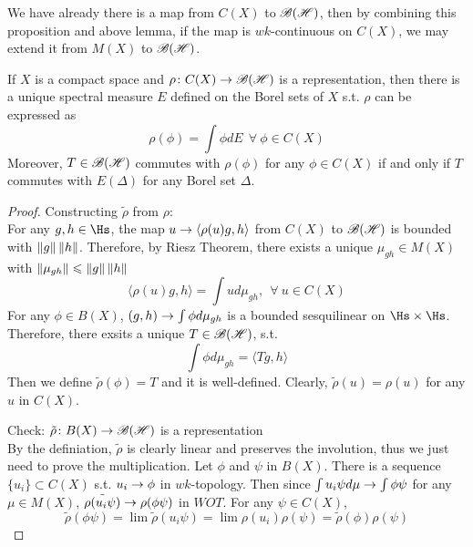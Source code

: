 We have already there is a map from $C(X)$ to $\mathscr{B(H)}$, then by combining this proposition and above lemma, if the map is $wk$-continuous on $C(X)$, we may extend it from $M(X)$ to $\mathscr{B(H)}$.

\begin{thm}
	If $X$ is a compact space and $\rho \colon C(X) \rightarrow \mathscr{B(H)}$ is a representation, then there is a unique spectral measure $E$ defined on the Borel sets of $X$ s.t. $\rho$ can be expressed as 
	\begin{equation*}
		\rho(\phi) = \int \phi dE ~~\forall~\phi \in C(X)
	\end{equation*}
	Moreover, $T \in \mathscr{B(H)}$ commutes with $\rho(\phi)$ for any $\phi \in C(X)$ if and only if $T$ commutes with $E(\Delta)$ for any Borel set $\Delta$.
\end{thm}
\begin{proof}
	Constructing $\tilde{\rho}$ from $\rho$: \\
	For any $g,h \in \Hs$, the map $u \rightarrow \langle \rho(u)g,h \rangle$ from $C(X)$ to $\mathscr{B(H)}$ is bounded with $\left\lVert g\right\lVert\left\lVert h\right\lVert$. Therefore, by Riesz Theorem, there exists a unique $\mu_{gh} \in M(X)$ with $\left\lVert\mu_{gh}\right\lVert \leqslant \left\lVert g\right\lVert\left\lVert h\right\lVert$
	\begin{equation*}
		\langle \rho(u)g,h \rangle = \int u d\mu_{gh},~~\forall~u \in C(X)
	\end{equation*}
	For any $\phi \in B(X)$, $(g,h) \rightarrow \int \phi d\mu_{gh}$ is a bounded sesquilinear on $\Hs \times \Hs$. Therefore, there exsits a unique $T \in \mathscr{B(H)}$, s.t.
	\begin{equation*}
		\int \phi d\mu_{gh} = \langle Tg,h \rangle
	\end{equation*}
	Then we define $\tilde{\rho}(\phi) = T$ and it is well-defined. Clearly, $\tilde{\rho}(u) = \rho(u)$ for any $u$ in $C(X)$.
	\item Check: $\tilde{\rho} \colon B(X) \rightarrow \mathscr{B(H)}$ is a representation \\
	By the definiation, $\tilde{\rho}$ is clearly linear and preserves the involution, thus we just need to prove the multiplication. Let $\phi$ and $\psi$ in $B(X)$. There is a sequence $\{u_i\} \subset C(X)$ s.t. $u_i \rightarrow \phi$ in $wk$-topology. Then since $\int u_i\psi d\mu \rightarrow \int \phi\psi$ for any $\mu \in M(X)$,  $\tilde{\rho(u_i\psi)} \rightarrow \rho(\phi\psi)$ in $WOT$. For any $\psi \in C(X)$,
	\begin{equation*}
		\tilde{\rho}(\phi\psi) = \lim \tilde{\rho}(u_i\psi) = \lim \rho(u_i)\rho(\psi) = \tilde{\rho}(\phi)\rho(\psi)
	\end{equation*}

\end{proof}
